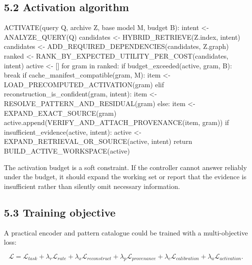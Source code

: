 \documentclass[
  10pt,
]{article}
\newenvironment{Shaded}{}{}
\newcommand{\NormalTok}[1]{#1}
\begin{document}
\subsection{5.2 Activation algorithm}\label{activation-algorithm}

\begin{Shaded}
\begin{Highlighting}[]
\NormalTok{ACTIVATE(query Q, archive Z, base model M, budget B):}
\NormalTok{    intent \textless{}{-} ANALYZE\_QUERY(Q)}
\NormalTok{    candidates \textless{}{-} HYBRID\_RETRIEVE(Z.index, intent)}
\NormalTok{    candidates \textless{}{-} ADD\_REQUIRED\_DEPENDENCIES(candidates, Z.graph)}
\NormalTok{    ranked \textless{}{-} RANK\_BY\_EXPECTED\_UTILITY\_PER\_COST(candidates, intent)}
\NormalTok{    active \textless{}{-} []}
\NormalTok{    for gram in ranked:}
\NormalTok{        if budget\_exceeded(active, gram, B):}
\NormalTok{            break}
\NormalTok{        if cache\_manifest\_compatible(gram, M):}
\NormalTok{            item \textless{}{-} LOAD\_PRECOMPUTED\_ACTIVATION(gram)}
\NormalTok{        elif reconstruction\_is\_confident(gram, intent):}
\NormalTok{            item \textless{}{-} RESOLVE\_PATTERN\_AND\_RESIDUAL(gram)}
\NormalTok{        else:}
\NormalTok{            item \textless{}{-} EXPAND\_EXACT\_SOURCE(gram)}
\NormalTok{        active.append(VERIFY\_AND\_ATTACH\_PROVENANCE(item, gram))}
\NormalTok{    if insufficient\_evidence(active, intent):}
\NormalTok{        active \textless{}{-} EXPAND\_RETRIEVAL\_OR\_SOURCE(active, intent)}
\NormalTok{    return BUILD\_ACTIVE\_WORKSPACE(active)}
\end{Highlighting}
\end{Shaded}

The activation budget is a soft constraint. If the controller cannot
answer reliably under the budget, it should expand the working set or
report that the evidence is insufficient rather than silently omit
necessary information.

\subsection{5.3 Training objective}\label{training-objective}

A practical encoder and pattern catalogue could be trained with a
multi-objective loss:

\[
\mathcal{L} = \mathcal{L}_{task}
+ \lambda_r \mathcal{L}_{rate}
+ \lambda_x \mathcal{L}_{reconstruct}
+ \lambda_p \mathcal{L}_{provenance}
+ \lambda_c \mathcal{L}_{calibration}
+ \lambda_a \mathcal{L}_{activation}.
\]
\end{document}
